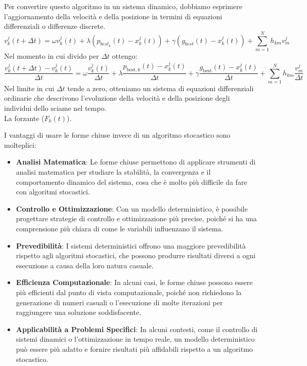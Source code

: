Per convertire questo algoritmo in un sistema dinamico, dobbiamo esprimere l'aggiornamento della velocità e 
della posizione in termini di equazioni differenziali o differenze discrete.
$$v_k^j(t+\Delta t)=\omega v_k^j(t)+\lambda(p_{{best}_k}(t)-x_k^j(t))+\gamma(g_{best}(t)-x_k^j(t))+ \sum_{m=1}^N h_{km}v_m^j$$
Nel momento in cui divido per $\Delta t$ ottengo:
$$\frac{v_k^j(t+\Delta t)-v_k^j(t)}{\Delta t}=\omega \frac{v_k^j(t)}{\Delta t}+\lambda\frac{p_{\text{best},k}(t)-x_k^j(t)}{\Delta t}+\gamma\frac{g_{\text{best}}(t)-x_k^j(t)}{\Delta t}+ \sum_{m=1}^N h_{km}\frac{v_m^j}{\Delta t}$$
Nel limite in cui $\Delta t$ tende a zero, otteniamo un sistema di equazioni differenziali ordinarie che descrivono 
l'evoluzione della velocità e della posizione degli individui dello sciame nel tempo.\\

La forzante ($F_k (t)$).

I vantaggi di usare le forme chiuse invece di un algoritmo stocastico sono molteplici:
\begin{itemize}
    \item \textbf{Analisi Matematica}: Le forme chiuse permettono di applicare strumenti di analisi matematica per studiare la stabilità, la convergenza e il comportamento dinamico del sistema, cosa che è molto più difficile da fare con algoritmi stocastici.
    \item \textbf{Controllo e Ottimizzazione}: Con un modello deterministico, è possibile progettare strategie di controllo e ottimizzazione più precise, poiché si ha una comprensione più chiara di come le variabili influenzano il sistema.
    \item \textbf{Prevedibilità}: I sistemi deterministici offrono una maggiore prevedibilità rispetto agli algoritmi stocastici, che possono produrre risultati diversi a ogni esecuzione a causa della loro natura casuale.
    \item \textbf{Efficienza Computazionale}: In alcuni casi, le forme chiuse possono essere più efficienti dal punto di vista computazionale, poiché non richiedono la generazione di numeri casuali o l'esecuzione di molte iterazioni per raggiungere una soluzione soddisfacente.
    \item \textbf{Applicabilità a Problemi Specifici}: In alcuni contesti, come il controllo di sistemi dinamici o l'ottimizzazione in tempo reale, un modello deterministico può essere più adatto e fornire risultati più affidabili rispetto a un algoritmo stocastico.
\end{itemize}

